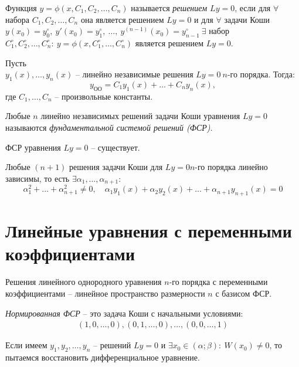 \begin{definition}[Решение $Ly=0$]
    Функция $y = \phi(x,C_1,C_2,\ldots,C_n)$ называется \emph{решением $Ly = 0$}, если для $\forall$ набора $C_1,C_2,\ldots,C_n$ она является решением $Ly = 0$ и для $\forall$ задачи Коши $y(x_0) = y_0^\circ, \ y'(x_0) = y_1^\circ, \ \ldots, \ y^{(n-1)}(x_0) = y_{n-1}^\circ \ \exists$ набор $C_1^\circ,C_2^\circ,\ldots,C_n^\circ: \ y = \phi(x,C_1^\circ,\ldots,C_n^\circ)$ является решением $Ly = 0$.
\end{definition}

\begin{theorem}
    Пусть \\ $y_1(x),\ldots,y_n(x)$ -- линейно независимые решения $Ly=0 \ n$-го порядка. Тогда:
    \[
        y_{\text{ОО}} = C_1y_1(x) + \ldots + C_ny_n(x),
    \]
    где $C_1,\ldots,C_n$ -- произвольные константы.
\end{theorem}

\begin{definition}
    Любые $n$ линейно независимых решений задачи Коши уравнения $Ly=0$ называются \emph{фундаментальной системой решений (ФСР)}.
\end{definition}

\begin{theorem}
    ФСР уравнения $Ly=0$ -- существует.
\end{theorem}

\begin{theorem}
    Любые $(n+1)$ решения задачи Коши для $Ly = 0 n$-го порядка линейно зависимы, то есть $\exists \alpha_1,\ldots,\alpha_{n+1}$:
    \[
        \alpha_1^2 + \ldots + \alpha_{n+1}^2 \ne 0, \quad \alpha_1y_1(x) + \alpha_2y_2(x) + \ldots + \alpha_{n+1}y_{n+1}(x) = 0
    \]
\end{theorem}

\section{Линейные уравнения с переменными коэффициентами}

\begin{note}
    Решения линейного однородного уравнения $n$-го порядка с переменными коэффициентами -- линейное пространство размерности $n$ с базисом ФСР.

    \emph{Нормированная ФСР} -- это задача Коши с начальными условиями:
    \begin{eqnarray*}
        (1,0,\ldots,0),(0,1,\ldots,0),\ldots,(0,0,\ldots,1)
    \end{eqnarray*}

    Если имеем $y_1,y_2,\ldots,y_n$ -- решений $Ly = 0$ и $\exists x_0 \in (\alpha;\beta): \ W(x_0) \ne 0$, то пытаемся восстановить дифференциальное уравнение.
\end{note}

